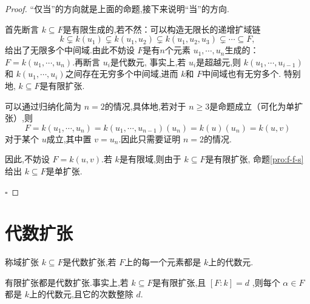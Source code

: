 \documentclass[lang=cn,12pt,color=green,fontset=none,pad]{elegantbook}
\begin{document}
\begin{proof}
    “仅当”的方向就是上面的命题,接下来说明“当”的方向.
    
    首先断言 \(  k\subseteq F  \)是有限生成的,若不然：可以构造无限长的递增扩域链 \[
    k \subsetneq k\left( u_1 \right)\subsetneq k\left( u_1,u_2 \right)\subsetneq k\left( u_1,u_2,u_3 \right)\subsetneq \cdots \subseteq F,   
    \] 给出了无限多个中间域.由此不妨设 \(  F  \)是有\(  n  \)个元素 \(   u_1,\cdots,u_n   \)生成的：\(  F=k\left(  u_1,\cdots,u_n  \right)   \).再断言 \(  u_{i}  \)是代数元,
    事实上,若 \(  u_{i}  \)是超越元,则 \(  k\left(  u_1,\cdots,u_{i-1} \right)   \)和 \(  k\left(  u_1,\cdots,u_i  \right)   \)之间存在无穷多个中间域,进而 \(  k  \)和 \(  F  \)中间域也有无穷多个.    
    特别地, \(  k\subseteq F  \)是有限扩张.
    
    可以通过归纳化简为 \(  n =  2  \)的情况,具体地,若对于 \(  n\ge 3  \)是命题成立（可化为单扩张）,则 \[
    F =  k\left( u_1,\cdots ,u_{n} \right) =  k\left( u_1,\cdots ,u_{n-1} \right)\left( u_{n} \right) =  k\left( u \right)\left( u_{n} \right) =  k\left( u,v \right)      
    \] 对于某个 \(  u  \)成立,其中置 \(  v =  u_{n}  \).因此只需要证明 \(  n =  2  \)的情况.
    
    因此,不妨设 \(  F =  k\left( u,v \right)   \).若 \(  k  \)是有限域,则由于 \(  k\subseteq F  \)是有限扩张, 命题\ref{pro:f-f-s} 给出 \(  k\subseteq F  \)是单扩张.
    
    
    \hfill $\square$
\end{proof}

\section{代数扩张}  

\begin{definition}
    称域扩张 \(  k\subseteq F  \)是代数扩张,若 \(  F  \)上的每一个元素都是 \(  k  \)上的代数元.   
\end{definition}

\begin{proposition}
    有限扩张都是代数扩张.事实上,若 \(  k\subseteq F  \)是有限扩张,且 \(  [F:k]= d  \)  ,则每个 \(  \alpha \in F  \)都是 \(  k  \)上的代数元,且它的次数整除 \(  d  \).   
\end{proposition}
\end{document}

